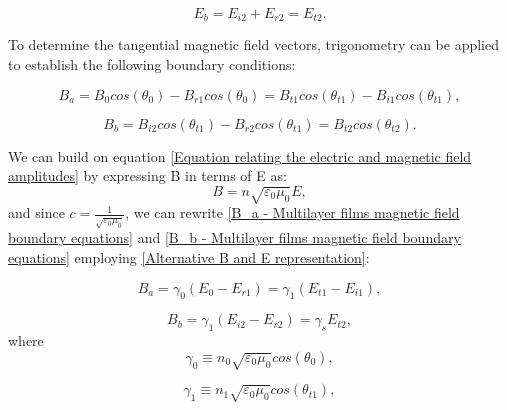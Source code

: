     \begin{equation} \label{E_b - Multilayer films electric field boundary equations}
    E_b = E_{i2} + E_{r2} = E_{t2}.
    \end{equation}

To determine the tangential magnetic field vectors, trigonometry can be applied to establish the following boundary conditions:

    \begin{equation} \label{B_a - Multilayer films magnetic field boundary equations}
    B_a = B_0cos(\theta_0) - B_{r1}cos(\theta_0) = B_{t1}cos(\theta_{t1}) - B_{i1}cos(\theta_{t1}),
    \end{equation}

    \begin{equation} \label{B_b - Multilayer films magnetic field boundary equations}
    B_b = B_{i2}cos(\theta_{t1}) - B_{r2}cos(\theta_{t1}) = B_{t2}cos(\theta_{t2}).
    \end{equation}

We can build on equation \ref{Equation relating the electric and magnetic field amplitudes} by expressing B in terms of E as:
    \begin{equation} \label{Alternative B and E representation}
    B = n\sqrt{\varepsilon_0\mu_0}E,
    \end{equation}
and since $c=\frac{1}{\sqrt{\varepsilon_0\mu_0}}$, we can rewrite \ref{B_a - Multilayer films magnetic field boundary equations} and \ref{B_b - Multilayer films magnetic field boundary equations} employing \ref{Alternative B and E representation}:

    \begin{equation} \label{Alternative B_a - Multilayer films magnetic field boundary equations}
    B_a = \gamma_0(E_0 - E_{r1}) = \gamma_1(E_{t1} - E_{i1}),
    \end{equation}

    \begin{equation} \label{Alternative B_b - Multilayer films magnetic field boundary equations}
    B_b = \gamma_1(E_{i2} - E_{r2}) = \gamma_sE_{t2},
    \end{equation}
where
    \begin{equation} \label{gamma 0}
        \gamma_0 \equiv n_0 \sqrt{\varepsilon_0\mu_0} cos(\theta_0),
    \end{equation}

    \begin{equation} \label{gamma 1}
        \gamma_1 \equiv n_1 \sqrt{\varepsilon_0\mu_0} cos(\theta_{t1}),
    \end{equation}

